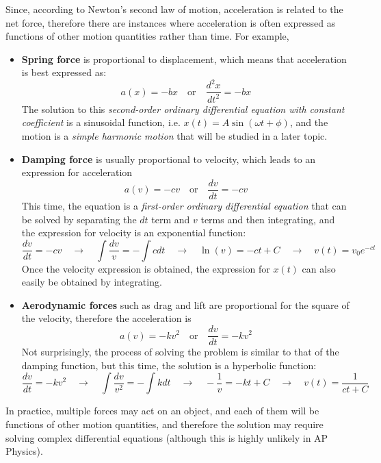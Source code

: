 \documentclass[11pt]{article}
\begin{document}
Since, according to Newton's second law of motion, acceleration is related to
the net force, therefore there are instances where acceleration is often
expressed as functions of other motion quantities rather than time. For example,
\begin{itemize}
\item\textbf{Spring force} is proportional to displacement, which means that
  acceleration is best expressed as:
  \begin{equation*}
    a(x)=-bx\quad\text{or}\quad \frac{d^2x}{dt^2}=-bx
  \end{equation*}
  The solution to this \emph{second-order ordinary differential equation with
    constant coefficient} is a sinusoidal function, i.e.
  $x(t)=A\sin(\omega t+\phi)$, and the motion is a \emph{simple harmonic
    motion} that will be studied in a later topic.
\item\textbf{Damping force} is usually proportional to velocity, which leads to
  an expression for acceleration
  \begin{equation*}
    a(v)=-cv\quad\text{or}\quad \frac{dv}{dt}=-cv
  \end{equation*}
  This time, the equation is a \emph{first-order ordinary differential equation}
  that can be solved by separating the $dt$ term and $v$ terms and then
  integrating, and the expression for velocity is an exponential function:
  \begin{equation*}
    \frac{dv}{dt}=-cv\quad\rightarrow\quad \int\frac{dv}{v}=-\int cdt
    \quad\rightarrow\quad \ln(v)=-ct+C
    \quad\rightarrow\quad v(t)=v_0e^{-ct}
  \end{equation*}
  Once the velocity expression is obtained, the expression for $x(t)$ can also
  easily be obtained by integrating.
\item\textbf{Aerodynamic forces} such as drag and lift are proportional for the
  square of the velocity, therefore the acceleration is
  \begin{equation*}
    a(v)=-kv^2\quad\text{or}\quad \frac{dv}{dt}=-kv^2
  \end{equation*}
  Not surprisingly, the process of solving the problem is similar to that of
  the damping function, but this time, the solution is a hyperbolic function:
  \begin{equation*}
    \frac{dv}{dt}=-kv^2\quad\rightarrow\quad \int\frac{dv}{v^2}=-\int kdt
    \quad\rightarrow\quad -\frac{1}{v}=-kt+C
    \quad\rightarrow\quad v(t)=\frac{1}{ct+C}
  \end{equation*}
\end{itemize}
In practice, multiple forces may act on an object, and each of them will be
functions of other motion quantities, and therefore the solution may require
solving complex differential equations (although this is highly unlikely in
AP Physics).
\end{document}
